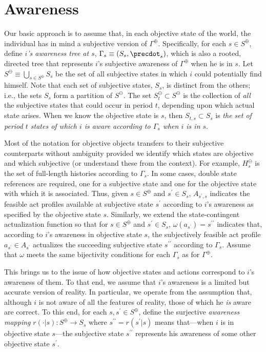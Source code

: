\documentclass[
11pt,
titlepage,
reqno,
]{article}%
\theoremstyle{definition}
\begin{document}
\section{Awareness}
Our basic approach is to assume that, in each objective state of the world, the individual has in mind a subjective version of $\Gamma^\oplus$. 
Specifically, for each $s\in S^\oplus$, define \textit{$i$'s awareness tree at $s$}, $\Gamma_s\equiv(S_s,\precdot_s)$, which is also a rooted, directed tree that represents $i$'s subjective awareness of $\Gamma^\oplus$ when he is in $s$.
Let $S^\ominus\equiv \bigcup_{s\in S^\oplus}S_s$ be the set of all subjective states in which $i$ could potentially find himself.
Note that each set of subjective states, $S_s$,  is distinct from the others; i.e., the sets $S_s$ form a partition of $S^\ominus$.
The set $S^\ominus_t\subset S^\ominus$ is the collection of \textit{all} the subjective states that could occur in period $t$, depending upon which actual state arises.
When we know the objective state is $s$, then $S_{t,s}\subset S_s$ is \textit{the set of period $t$ states of which $i$ is aware according to $\Gamma_s$ when $i$ is in $s$}.

Most of the notation for objective objects transfers to their subjective counterparts without ambiguity provided we identify which states are objective and which subjective (or understand these from the context).
For example, $H^\ominus_s$ is the set of full-length histories according to $\Gamma_s$.
In some cases, double state references are required, one for a subjective state and one for the objective state with which it is associated.
Thus, given $s\in S^\oplus$ and $s^\prime\in S_s$, $A_{s^\prime,s}$ indicates the feasible act profiles available at subjective state $s^\prime$ according to $i$'s awareness as specified by the objective state $s$.
Similarly, we extend the state-contingent actualization function so that for $s\in S^\oplus$ and $s^\prime\in S_s$, $\omega(a_{s^\prime})=s^{\prime\prime}$ indicates that, according to $i$'s awareness  in objective state $s$, the subjectively feasible act profile $a_{s^\prime}\in A_{s^\prime}$ actualizes the succeeding subjective state $s^{\prime\prime}$ according to $\Gamma_s$.
Assume that $\omega$ meets the same bijectivity conditions for each $\Gamma_s$ as for $\Gamma^\oplus$.
	
This brings us to the issue of how objective states and actions correspond to $i$'s awareness of them.
To that end, we assume that $i$'s awareness is a limited but accurate version of reality.
In particular, we  operate from the assumption that, although $i$ is not aware of all the features of reality,  those of which he \textit{is} aware are correct.  	
To this end, for each $s,s^\prime\in S^\oplus$, define the surjective \textit{awareness mapping} $r(\cdot|s):S^\oplus\rightarrow S_s$ where $s^{\prime\prime}=r(s^\prime|s)$ means that---when $i$ is in objective state $s$---the subjective state $s^{\prime\prime}$  represents his awareness of some other objective state $s^\prime$.
\end{document}
